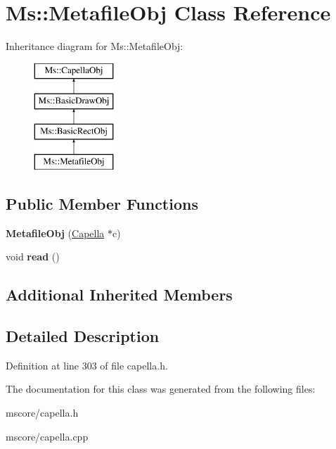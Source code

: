\hypertarget{class_ms_1_1_metafile_obj}{}\section{Ms\+:\+:Metafile\+Obj Class Reference}
\label{class_ms_1_1_metafile_obj}
Inheritance diagram for Ms\+:\+:Metafile\+Obj\+:\begin{figure}[H]
\begin{center}
\leavevmode
\includegraphics[height=4.000000cm]{class_ms_1_1_metafile_obj}
\end{center}
\end{figure}
\subsection*{Public Member Functions}
\begin{DoxyCompactItemize}
\item 
\mbox{\label{class_ms_1_1_metafile_obj_ad745ef1163af1cf188236ec9bef534a3}} 
{\bfseries Metafile\+Obj} (\hyperlink{class_ms_1_1_capella}{Capella} $\ast$c)
\item 
\mbox{\label{class_ms_1_1_metafile_obj_a50ff529a72200f240ea05dc06d979479}} 
void {\bfseries read} ()
\end{DoxyCompactItemize}
\subsection*{Additional Inherited Members}


\subsection{Detailed Description}


Definition at line 303 of file capella.\+h.



The documentation for this class was generated from the following files\+:\begin{DoxyCompactItemize}
\item 
mscore/capella.\+h\item 
mscore/capella.\+cpp\end{DoxyCompactItemize}
